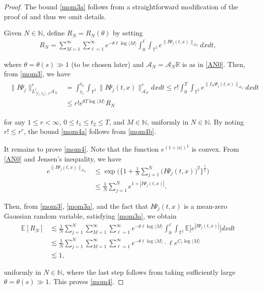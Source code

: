 \documentclass[letterpaper, 11pt,  reqno]{amsart}
\newcommand{\1}{\hspace{0.5mm}\text{I}\hspace{0.2mm}}
\newcommand{\noi}{\noindent}
\newcommand{\R}{\mathbb{R}}
\newcommand{\T}{\mathbb{T}}
\newcommand{\N}{\mathbb{N}}
\newcommand{\E}{\mathbb{E}}
\newcommand{\ta}{\theta}
\newcommand{\les}{\lesssim}
\newcommand{\A}{\mathcal{A}}
\newcommand{\jb}[1]{\langle #1 \rangle}
\renewcommand{\l}{\ell}
\numberwithin{equation}{section}
\numberwithin{theorem}{section}
\begin{document}
\begin{proof}
The bound \eqref{mom3a}
follows
from a straightforward modification of the proof of 
\cite[Lemma~2.4]{GKOT} and thus we omit details.



Given $N \in \N$, 
define $R_N = R_N(\ta)$ by setting 
\begin{align}
R_N = \sum_{M = 1}^\infty \sum_{\l = 1}^\infty
e^{-\ta \l \log \jb{M}}
\int_0^\l \int_{\T^2}e^{\|I \Psi_j (t, x) \|_{\A_N}} dx dt, 
\label{mom3}
\end{align}




\noi
where $\ta = \ta(s) \gg 1$ (to be chosen later)  and $\A_N = \A_N \R$ is as in \eqref{AN0}.
Then, from \eqref{mom3}, we have 
\begin{align}
\begin{split}
\| I \Psi_j  \|_{L^r_{[t_1, t_2], x}\A_N}^r 
& = \int_{t_1}^{t_2}\int_{\T^2}
\| I \Psi_j(t, x)\|_{\A_N}^r 
 dx dt 
 \leq r!  \int_0^T 
\int_{\T^2}
e^{\| I_N \Psi_j( t, x)\|_{\A_N}}
 dx dt \\
& \le
r! e^{\ta T \log \jb{M}} R_N 
\end{split}
\label{mom4b}
\end{align}

\noi
for any 
$1 \le r < \infty$, 
$0 \le t_1  \le t_2 \le T$, 
and $M \in \N$, 
uniformly in $N \in \N$.
By noting $r! \le r^r$, 
the bound \eqref{mom4a} follows from \eqref{mom4b}.

It remains to prove \eqref{mom4}.
Note that the function $e^{(1+|x|)^\frac 12}$ is convex.
From \eqref{AN0}
and Jensen's inequality, we have 
\begin{align*}
e^{\| I \Psi_j (t, x) \|_{\A_N}}
& \le  \exp\bigg( \Big\{1+  \frac 1N\sum_{j = 1}^N \big( I \Psi_j (t, x)\big)^2 \Big\}^\frac 12 \bigg)\\
& \le 
\frac 1N \sum_{j = 1}^N e^{1 + | I \Psi_j (t, x)|}.
\end{align*}

\noi
Then, from \eqref{mom3},  \eqref{mom3a}, 
and the fact that 
 $I \Psi_j (t, x)$ is a mean-zero Gaussian random variable, 
satisfying \eqref{mom3a}, 
we obtain
\begin{align*}
\E[R_N] 
& 
\les 
\frac 1N \sum_{j = 1}^N
 \sum_{M = 1}^\infty \sum_{\l = 1}^\infty
e^{-\ta \l \log \jb{M}}
\int_0^\l \int_{\T^2}
\E\Big[e^{|I \Psi_j (t, x)|}\Big] dx dt\\
& \les 
\frac 1N \sum_{j = 1}^N
 \sum_{M = 1}^\infty \sum_{\l = 1}^\infty
e^{-\ta \l \log \jb{M}}\cdot 
\l e^{C_s \log \jb{M}} \\
& \les 1,
\end{align*}

\noi
uniformly in $N \in \N$, 
where the last step follows
from taking  
 sufficiently large
$\ta = \ta(s)\gg1 $.
This proves \eqref{mom4}.
\end{proof}
\end{document}
